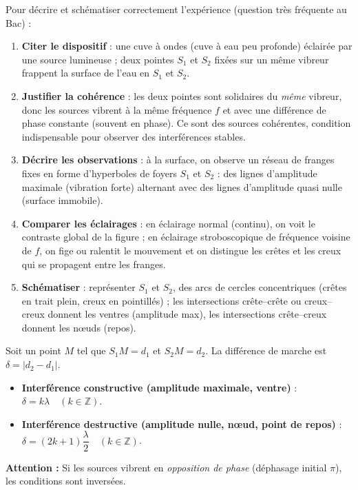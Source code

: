 \documentclass[11pt]{article}
\newcommand{\cle}[1]{{\popxbold\color{popdark}#1}}
\newcounter{popsec}
\newcounter{popsub}
\newcommand{\courssub}[1]{%
  \stepcounter{popsub}%
  \par\vspace{9pt}\noindent{\popxbold\fontsize{11.5}{13}\selectfont\color{popink}{\color{poporange}\thepopsec.\thepopsub}\hspace{6pt}#1}\par\nopagebreak\vspace{4pt}
}
\begin{document}
\courssub{Interférences à la surface de l'eau}

\begin{methode}
Pour décrire et schématiser correctement l'expérience (question très fréquente au Bac) :
\begin{enumerate}
\item \textbf{Citer le dispositif} : une cuve à ondes (cuve à eau peu profonde) éclairée par une source lumineuse ; deux pointes $S_1$ et $S_2$ fixées sur un même vibreur frappent la surface de l'eau en $S_1$ et $S_2$.
\item \textbf{Justifier la cohérence} : les deux pointes sont solidaires du \emph{même} vibreur, donc les sources vibrent à la même fréquence $f$ et avec une différence de phase constante (souvent en phase). Ce sont des \cle{sources cohérentes}, condition indispensable pour observer des interférences stables.
\item \textbf{Décrire les observations} : à la surface, on observe un réseau de franges fixes en forme d'\cle{hyperboles} de foyers $S_1$ et $S_2$ : des lignes d'amplitude maximale (vibration forte) alternant avec des lignes d'amplitude quasi nulle (surface immobile).
\item \textbf{Comparer les éclairages} : en \cle{éclairage normal} (continu), on voit le contraste global de la figure ; en \cle{éclairage stroboscopique} de fréquence voisine de $f$, on fige ou ralentit le mouvement et on distingue les crêtes et les creux qui se propagent entre les franges.
\item \textbf{Schématiser} : représenter $S_1$ et $S_2$, des arcs de cercles concentriques (crêtes en trait plein, creux en pointillés) ; les intersections crête--crête ou creux--creux donnent les ventres (amplitude max), les intersections crête--creux donnent les nœuds (repos).
\end{enumerate}
\end{methode}

\begin{propriete}
Soit un point $M$ tel que $S_1M = d_1$ et $S_2M = d_2$. La différence de marche est $\delta = |d_2 - d_1|$.
\begin{itemize}
\item \textbf{Interférence constructive (amplitude maximale, ventre)} : $\delta = k\lambda \quad (k \in \mathbb{Z})$.
\item \textbf{Interférence destructive (amplitude nulle, nœud, point de repos)} : $\delta = (2k+1)\dfrac{\lambda}{2} \quad (k \in \mathbb{Z})$.
\end{itemize}
\textbf{Attention :} Si les sources vibrent en \emph{opposition de phase} (déphasage initial $\pi$), les conditions sont inversées.
\end{propriete}
\end{document}

